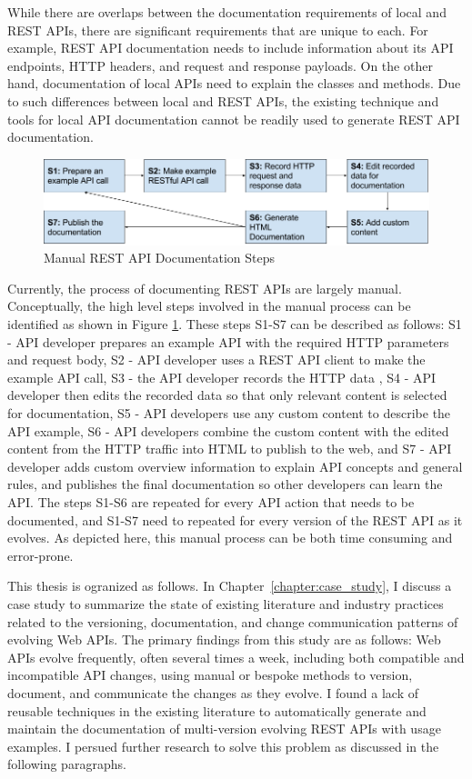 \documentclass[12pt]{ucalgthes1}
\begin{document}
While there are overlaps between the documentation requirements of local and REST APIs, there are significant requirements that are unique to each. For example, REST API documentation needs to include information about its API endpoints, HTTP headers, and request and response payloads. On the other hand, documentation of local APIs need to explain the classes and methods. Due to such differences between local and REST APIs, the existing technique and tools for local API documentation cannot be readily used to generate REST API documentation.

\begin{figure}[htb]
  \includegraphics[width=\linewidth]{manual_workflow.png}
  \caption{Manual REST API Documentation Steps}
  \label{fig:manual}
\end{figure}

Currently, the process of documenting REST APIs are largely manual. Conceptually, the high level steps involved in the manual process can be identified as shown in Figure \ref{fig:manual}. These steps S1-S7 can be described as follows: S1 - API developer prepares an example API with the required HTTP parameters and request body, S2 - API developer uses a REST API client to make the example API call, S3 - the API developer records the HTTP data , S4 - API developer then edits the recorded data so that only relevant content is selected for documentation, S5 - API developers use any custom content to describe the API example, S6 - API developers combine the custom content with the edited content from the HTTP traffic into HTML to publish to the web, and S7 - API developer adds custom overview information to explain API concepts and general rules, and publishes the final documentation so other developers can learn the API. The steps S1-S6 are repeated for every API action that needs to be documented, and S1-S7 need to repeated for every version of the REST API as it evolves. As depicted here, this manual process can be both time consuming and error-prone.

This thesis is ogranized as follows. In Chapter~\ref{chapter:case_study}, I discuss a case study to summarize the state of existing literature and industry practices related to the versioning, documentation, and change communication patterns of evolving Web APIs. The primary findings from this study are as follows: Web APIs evolve frequently, often several times a week, including both compatible and incompatible API changes, using manual or bespoke methods to version, document, and communicate the changes as they evolve. I found a lack of reusable techniques in the existing literature to automatically generate and maintain the documentation of multi-version evolving REST APIs with usage examples. I persued further research to solve this problem as discussed in the following paragraphs.
\end{document}
